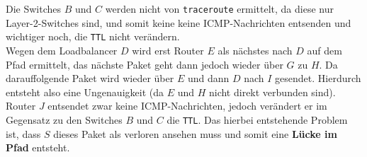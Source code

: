 \documentclass[12pt, a4paper]{article}
\begin{document}
Die Switches $B$ und $C$ werden nicht von \verb|traceroute| ermittelt, da diese nur Layer-2-Switches sind, und somit keine keine ICMP-Nachrichten entsenden und wichtiger noch, die \verb|TTL| nicht verändern.\\
Wegen dem Loadbalancer $D$ wird erst Router $E$ als nächstes nach $D$ auf dem Pfad ermittelt, das nächste Paket geht dann jedoch wieder über $G$ zu $H$. Da darauffolgende Paket wird wieder über $E$ und dann $D$ nach $I$ gesendet. Hierdurch entsteht also eine Ungenauigkeit (da $E$ und $H$ nicht direkt verbunden sind).\\
Router $J$ entsendet zwar keine ICMP-Nachrichten, jedoch verändert er im Gegensatz zu den Switches $B$ und $C$ die \verb|TTL|. Das hierbei entstehende Problem ist, dass $S$ dieses Paket als verloren ansehen muss und somit eine \textbf{Lücke im Pfad} entsteht.
\end{document}
